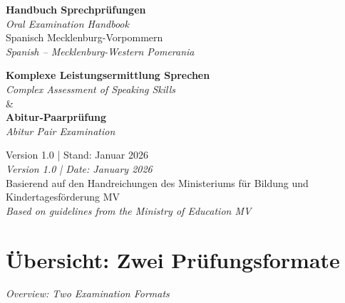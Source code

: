 \documentclass[11pt,a4paper]{article}
\newcommand{\bisection}[2]{%
    \section{#1}%
    {\small\color{englishgray}\textit{#2}}\par\vspace{6pt}%
}
\begin{document}
\begin{titlepage}
\centering
\vspace*{2cm}

{\Huge\bfseries\color{spanischrot} Handbuch Sprechprüfungen}\\[0.5cm]
{\Large\color{englishgray}\textit{Oral Examination Handbook}}\\[1.5cm]

{\LARGE Spanisch Mecklenburg-Vorpommern}\\[0.3cm]
{\large\color{englishgray}\textit{Spanish -- Mecklenburg-Western Pomerania}}\\[2cm]

\begin{tcolorbox}[width=12cm, colback=white, colframe=spanischrot]
\centering
{\large\bfseries Komplexe Leistungsermittlung Sprechen}\\
{\color{englishgray}\textit{Complex Assessment of Speaking Skills}}\\[0.5cm]
\&\\[0.5cm]
{\large\bfseries Abitur-Paarprüfung}\\
{\color{englishgray}\textit{Abitur Pair Examination}}
\end{tcolorbox}

\vfill

{\large Version 1.0 | Stand: Januar 2026}\\[0.3cm]
{\color{englishgray}\textit{Version 1.0 | Date: January 2026}}\\[1cm]

{\small Basierend auf den Handreichungen des Ministeriums für Bildung und Kindertagesförderung MV}\\
{\small\color{englishgray}\textit{Based on guidelines from the Ministry of Education MV}}

\end{titlepage}

\tableofcontents
\newpage

\bisection{Übersicht: Zwei Prüfungsformate}{Overview: Two Examination Formats}
\end{document}

